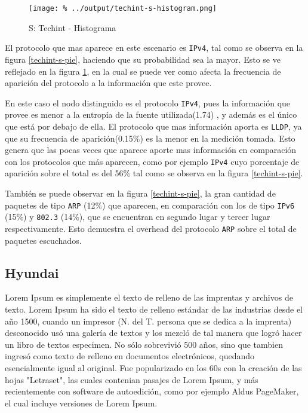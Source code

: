 \documentclass[final,inline,a4paper,narroweqnarray]{ieee}
\begin{document}
     
    \begin{figure}[ht]\begin{center}
      \texttt{[image: \%
      ../output/techint-s-histogram.png]}
      \caption{S: Techint - Histograma}
      \label{techint-s-histogram}
    \end{center}\end{figure}


    El protocolo que mas aparece en este escenario es \texttt{IPv4}, tal
    como se observa en la figura \ref{techint-s-pie}, haciendo que 
    su probabilidad sea la
    mayor. Esto se ve reflejado en la figura \ref{techint-s-histogram},
    en la cual se puede ver como
    afecta la frecuencia de aparición del protocolo a la información
    que este provee.


    En este caso el nodo distinguido es el protocolo \texttt{IPv4}, 
    pues la información que provee es menor a la entropía de la fuente 
    utilizada(1.74) , y además es el único que está por debajo de ella. El
    protocolo que mas información aporta es \texttt{LLDP}, ya que
    su frecuencia de aparición(0.15\%) es la menor en la medición tomada. Esto
    genera que las pocas veces que aparece aporte mas información en 
    comparación con los protocolos que más aparecen, como por ejemplo 
    \texttt{IPv4} cuyo porcentaje de aparición sobre el total es del 56\%
    tal como se observa en la figura \ref{techint-s-pie}.

    También se puede observar en la figura \ref{techint-s-pie}, la gran cantidad de paquetes 
    de tipo \texttt{ARP} (12\%) que aparecen, en comparación con los
    de tipo \texttt{IPv6} (15\%) y \texttt{802.3} (14\%), que se encuentran
    en segundo lugar y tercer lugar respectivamente. Esto demuestra el overhead
    del protocolo \texttt{ARP} sobre el total de paquetes escuchados.

  \subsection{Hyundai}

Lorem Ipsum es simplemente el texto de relleno de las imprentas y archivos de texto. Lorem Ipsum ha sido el texto de relleno estándar de las industrias desde el año 1500, cuando un impresor (N. del T. persona que se dedica a la imprenta) desconocido usó una galería de textos y los mezcló de tal manera que logró hacer un libro de textos especimen. No sólo sobrevivió 500 años, sino que tambien ingresó como texto de relleno en documentos electrónicos, quedando esencialmente igual al original. Fue popularizado en los 60s con la creación de las hojas "Letraset", las cuales contenian pasajes de Lorem Ipsum, y más recientemente con software de autoedición, como por ejemplo Aldus PageMaker, el cual incluye versiones de Lorem Ipsum.
\end{document}
